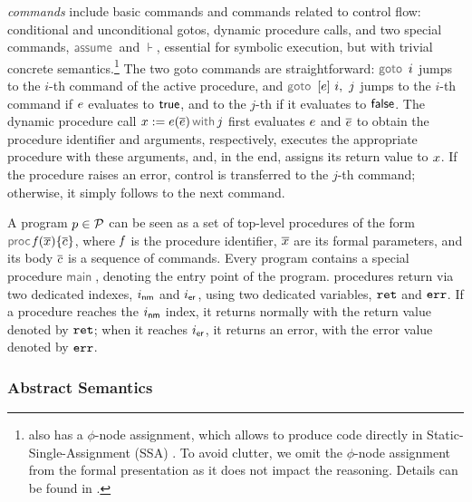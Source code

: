 \jsil \emph{commands} include \jsil basic commands and commands related to control flow: conditional and unconditional gotos, dynamic procedure calls, and two special commands, $\assume$ and $\assert$, essential for symbolic execution, but with trivial concrete semantics.\footnote{\jsil also has a $\phi$-node assignment, which allows \JSComp to produce code directly in Static-Single-Assignment (SSA) \cite{SSA}. To avoid clutter, we omit the $\phi$-node assignment from the formal presentation as it does not impact the reasoning. Details can be found in \cite{javert}.} 
The two goto commands are straightforward: $\goto \ i$ jumps to the $i$-th command of the active procedure, and $\ifgoto{\jsilexpr}{i}{j}$ jumps to the $i$-th command if $e$ evaluates to ${\sf true}$, and to the $j$-th if it evaluates to ${\sf false}$. 
The dynamic procedure call $\jsilcall{\jvar}{\jsilexpr}{\jvec{\jsilexpr}}{j}$ first evaluates  $e$ and $\overline{e}$ to obtain the procedure identifier and arguments, respectively, executes the appropriate procedure with these arguments, and, in the end, assigns its return value to $x$.
If the procedure raises an error, control is transferred to the $j$-th command; otherwise, it simply follows to the next command. 

A \jsil program $p \in \mathcal{P}$ can be seen as a set of top-level procedures of the form $\procedure{\pid}{\jvec{\jvar}}{\jvec{\jcmd}}$, where $\mathit{f}$ is the procedure identifier, $\overline{x}$ are its formal parameters, and its body ${\overline{c}}$  is a sequence of \jsil commands.
Every \jsil program contains a special procedure $\jsilmain$\hspace{-2pt}, denoting the entry point of the program. 
\jsil procedures return via two dedicated indexes, $i_{{\sf nm}}$ and $i_{{\sf er}}$, using two dedicated variables, $\mathtt{ret}$ and $\mathtt{err}$. If a procedure reaches the $i_{{\sf nm}}$ index, it returns normally with the return value denoted by $\mathtt{ret}$; when it reaches $i_{{\sf er}}$, it returns an error, with the error value denoted by $\mathtt{err}$.

%

\subsubsection{Abstract Semantics}

